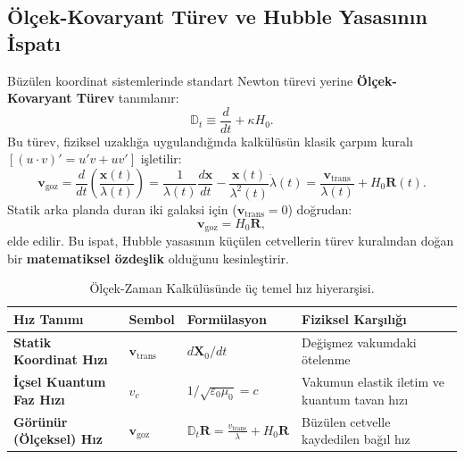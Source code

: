 \subsection{Ölçek-Kovaryant Türev ve Hubble Yasasının İspatı}
Büzülen koordinat sistemlerinde standart Newton türevi yerine \textbf{Ölçek-Kovaryant Türev} tanımlanır:
\begin{equation}
    \mathbb{D}_t \equiv \frac{d}{dt} + \kappa H_0.
    \label{eq:olcek_turev_main}
\end{equation}
Bu türev, fiziksel uzaklığa uygulandığında kalkülüsün klasik çarpım kuralı $[(u \cdot v)' = u'v + uv']$ işletilir:
\begin{equation}
    \mathbf{v}_{\mathrm{goz}} = \frac{d}{dt}\left( \frac{\mathbf{x}(t)}{\lambda(t)} \right) = \frac{1}{\lambda(t)} \frac{d\mathbf{x}}{dt} - \frac{\mathbf{x}(t)}{\lambda^2(t)} \dot{\lambda}(t) = \frac{\mathbf{v}_{\mathrm{trans}}}{\lambda(t)} + H_0 \mathbf{R}(t).
    \label{eq:hubble_turev_ispat}
\end{equation}
Statik arka planda duran iki galaksi için ($\mathbf{v}_{\mathrm{trans}} = 0$) doğrudan:
\begin{equation}
    \mathbf{v}_{\mathrm{goz}} = H_0 \mathbf{R},
    \label{eq:hubble_dogrudan}
\end{equation}
elde edilir. Bu ispat, Hubble yasasının küçülen cetvellerin türev kuralından doğan bir \textbf{matematiksel özdeşlik} olduğunu kesinleştirir.

\begin{table}[h!]
    \centering
    \small
    \begin{tabular}{@{}llll@{}}
        \toprule
        \textbf{Hız Tanımı}             & \textbf{Sembol}               & \textbf{Formülasyon}                                                            & \textbf{Fiziksel Karşılığı}                  \\ \midrule
        \textbf{Statik Koordinat Hızı}  & $\mathbf{v}_{\mathrm{trans}}$ & $d\mathbf{X}_0/dt$                                                              & Değişmez vakumdaki ötelenme                  \\
        \textbf{İçsel Kuantum Faz Hızı} & $v_c$                         & $1/\sqrt{\varepsilon_0\mu_0} = c$                                               & Vakumun elastik iletim ve kuantum tavan hızı \\
        \textbf{Görünür (Ölçeksel) Hız} & $\mathbf{v}_{\mathrm{goz}}$   & $\mathbb{D}_t \mathbf{R} = \frac{v_{\mathrm{trans}}}{\lambda} + H_0 \mathbf{R}$ & Büzülen cetvelle kaydedilen bağıl hız        \\ \bottomrule
    \end{tabular}
    \caption{Ölçek-Zaman Kalkülüsünde üç temel hız hiyerarşisi.}
    \label{tab:hiz_hiyerarsisi_main}
\end{table}

